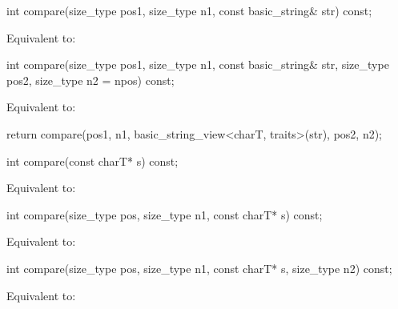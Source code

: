 %
\begin{itemdecl}
int compare(size_type pos1, size_type n1, const basic_string& str) const;
\end{itemdecl}

\begin{itemdescr}
\pnum
\effects
Equivalent to:
\end{itemdescr}

%
\begin{itemdecl}
int compare(size_type pos1, size_type n1, const basic_string& str,
            size_type pos2, size_type n2 = npos) const;
\end{itemdecl}

\begin{itemdescr}
\pnum
\effects Equivalent to:
\begin{codeblock}
return compare(pos1, n1, basic_string_view<charT, traits>(str), pos2, n2);
\end{codeblock}
\end{itemdescr}

%
\begin{itemdecl}
int compare(const charT* s) const;
\end{itemdecl}

\begin{itemdescr}
\pnum
\effects Equivalent to:
\end{itemdescr}

%
\begin{itemdecl}
int compare(size_type pos, size_type n1, const charT* s) const;
\end{itemdecl}

\begin{itemdescr}
\pnum
\effects
Equivalent to: 
\end{itemdescr}

%
\begin{itemdecl}
int compare(size_type pos, size_type n1, const charT* s, size_type n2) const;
\end{itemdecl}

\begin{itemdescr}
\pnum
\effects
Equivalent to: 
\end{itemdescr}

